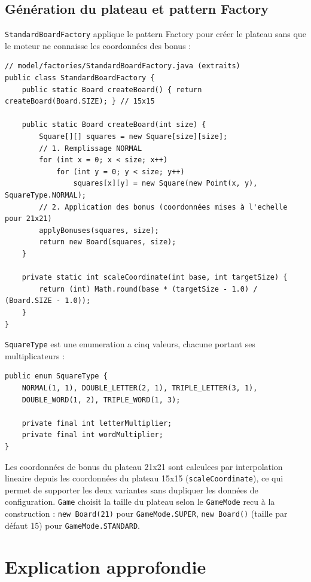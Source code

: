 \documentclass[a4paper]{article}
\begin{document}
\subsection{Génération du plateau et pattern Factory}
\texttt{StandardBoardFactory} applique le pattern Factory pour créer le plateau sans que le moteur ne connaisse les coordonnées des bonus :

\begin{verbatim}
// model/factories/StandardBoardFactory.java (extraits)
public class StandardBoardFactory {
    public static Board createBoard() { return createBoard(Board.SIZE); } // 15x15

    public static Board createBoard(int size) {
        Square[][] squares = new Square[size][size];
        // 1. Remplissage NORMAL
        for (int x = 0; x < size; x++)
            for (int y = 0; y < size; y++)
                squares[x][y] = new Square(new Point(x, y), SquareType.NORMAL);
        // 2. Application des bonus (coordonnées mises à l'echelle pour 21x21)
        applyBonuses(squares, size);
        return new Board(squares, size);
    }

    private static int scaleCoordinate(int base, int targetSize) {
        return (int) Math.round(base * (targetSize - 1.0) / (Board.SIZE - 1.0));
    }
}
\end{verbatim}

\texttt{SquareType} est une enumeration a cinq valeurs, chacune portant ses multiplicateurs :

\begin{verbatim}
public enum SquareType {
    NORMAL(1, 1), DOUBLE_LETTER(2, 1), TRIPLE_LETTER(3, 1),
    DOUBLE_WORD(1, 2), TRIPLE_WORD(1, 3);

    private final int letterMultiplier;
    private final int wordMultiplier;
}
\end{verbatim}

Les coordonnées de bonus du plateau 21x21 sont calculees par interpolation lineaire depuis les coordonnées du plateau 15x15 (\texttt{scaleCoordinate}), ce qui permet de supporter les deux variantes sans dupliquer les données de configuration. \texttt{Game} choisit la taille du plateau selon le \texttt{GameMode} recu à la construction : \texttt{new Board(21)} pour \texttt{GameMode.SUPER}, \texttt{new Board()} (taille par défaut 15) pour \texttt{GameMode.STANDARD}.

\section{Explication approfondie}
\end{document}
